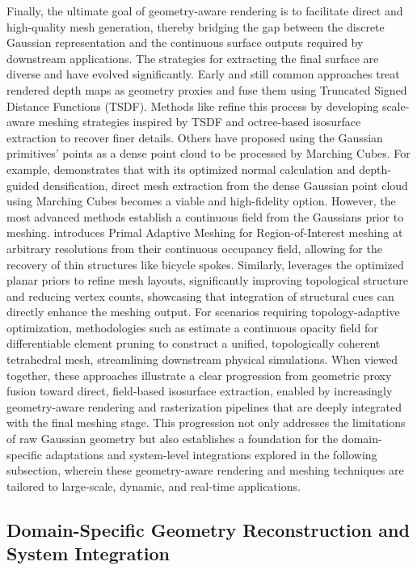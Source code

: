 \documentclass[11pt]{article}
\begin{document}
Finally, the ultimate goal of geometry-aware rendering is to facilitate direct and high-quality mesh generation, thereby bridging the gap between the discrete Gaussian representation and the continuous surface outputs required by downstream applications. The strategies for extracting the final surface are diverse and have evolved significantly. Early and still common approaches treat rendered depth maps as geometry proxies and fuse them using Truncated Signed Distance Functions (TSDF). Methods like \cite{ref186} refine this process by developing scale-aware meshing strategies inspired by TSDF and octree-based isosurface extraction to recover finer details. Others have proposed using the Gaussian primitives' points as a dense point cloud to be processed by Marching Cubes. For example, \cite{ref217} demonstrates that with its optimized normal calculation and depth-guided densification, direct mesh extraction from the dense Gaussian point cloud using Marching Cubes becomes a viable and high-fidelity option. However, the most advanced methods establish a continuous field from the Gaussians prior to meshing. \cite{ref22} introduces Primal Adaptive Meshing for Region-of-Interest meshing at arbitrary resolutions from their continuous occupancy field, allowing for the recovery of thin structures like bicycle spokes. Similarly, \cite{ref193} leverages the optimized planar priors to refine mesh layouts, significantly improving topological structure and reducing vertex counts, showcasing that integration of structural cues can directly enhance the meshing output. For scenarios requiring topology-adaptive optimization, methodologies such as \cite{ref218} estimate a continuous opacity field for differentiable element pruning to construct a unified, topologically coherent tetrahedral mesh, streamlining downstream physical simulations. When viewed together, these approaches illustrate a clear progression from geometric proxy fusion toward direct, field-based isosurface extraction, enabled by increasingly geometry-aware rendering and rasterization pipelines that are deeply integrated with the final meshing stage. This progression not only addresses the limitations of raw Gaussian geometry but also establishes a foundation for the domain-specific adaptations and system-level integrations explored in the following subsection, wherein these geometry-aware rendering and meshing techniques are tailored to large-scale, dynamic, and real-time applications.

\subsection{Domain-Specific Geometry Reconstruction and System Integration}
\end{document}
